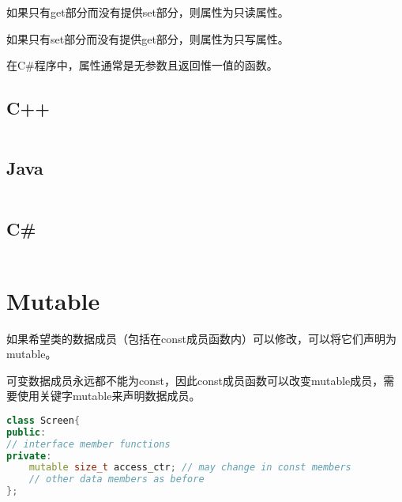 \begin{compactitem}
\item 如果只有get部分而没有提供set部分，则属性为只读属性。
\item 如果只有set部分而没有提供get部分，则属性为只写属性。
\end{compactitem}

在C\#程序中，属性通常是无参数且返回惟一值的函数。





\subsection{C++}


\begin{lstlisting}[language=C++]

\end{lstlisting}




\subsection{Java}


\begin{lstlisting}[language=C++]

\end{lstlisting}



\subsection{C\#}



\begin{lstlisting}[language=C++]

\end{lstlisting}

\section{Mutable}

如果希望类的数据成员（包括在const成员函数内）可以修改，可以将它们声明为mutable。

可变数据成员永远都不能为const，因此const成员函数可以改变mutable成员，需要使用关键字mutable来声明数据成员。

\begin{lstlisting}[language=C++]
class Screen{
public:
// interface member functions
private:
	mutable size_t access_ctr; // may change in const members
	// other data members as before
};
\end{lstlisting}



